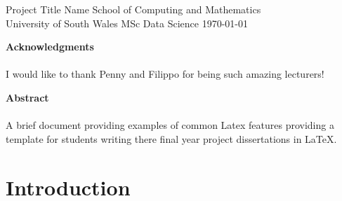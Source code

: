 \documentclass[12pt]{report}
\begin{document}
\onehalfspacing

\begin{titlepage}
\thesistitle
                {Project Title}
                {Name}
                {School of Computing and Mathematics\\
                University of South Wales}
                {MSc Data Science}
                {\today}
\end{titlepage}
\newpage

\setcounter{page}{2}



\thispagestyle{empty}
\begin{center}
    \Large
    \textbf{Acknowledgments} \\ ~ \\
    \normalsize
    I would like to thank Penny and Filippo for being such amazing lecturers!
\end{center}
\newpage

\thispagestyle{empty}
\begin{center}
    \Large
    \textbf{Abstract} \\ ~ \\
    \normalsize
    A brief document providing examples of common Latex features providing a template for students writing there final year project dissertations in \LaTeX.
\end{center}
\newpage

\tableofcontents

\newpage

\chapter{Introduction} \label{chp:intro}
\cite{Shalev-Shwartz}
\end{document}

